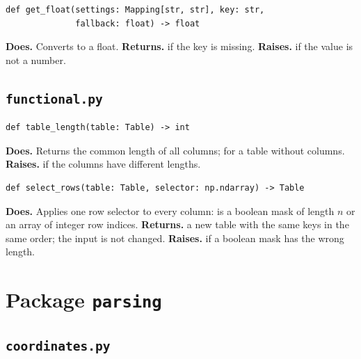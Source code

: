 \documentclass{article}
\newenvironment{card}{\par\smallskip\noindent\begin{minipage}{\linewidth}}{\end{minipage}\par}
\begin{document}
\begin{card}
\begin{lstlisting}[style=sig]
def get_float(settings: Mapping[str, str], key: str,
              fallback: float) -> float
\end{lstlisting}
\textbf{Does.} Converts  to a float. \textbf{Returns.}
 if the key is missing. \textbf{Raises.}  if
the value is not a number.
\end{card}

\subsection{\texttt{functional.py}}

\begin{card}
\begin{lstlisting}[style=sig]
def table_length(table: Table) -> int
\end{lstlisting}
\textbf{Does.} Returns the common length of all columns;  for a table
without columns. \textbf{Raises.}  if the columns have
different lengths.
\end{card}

\begin{card}
\begin{lstlisting}[style=sig]
def select_rows(table: Table, selector: np.ndarray) -> Table
\end{lstlisting}
\textbf{Does.} Applies one row selector to every column:  is a
boolean mask of length $n$ or an array of integer row indices. \textbf{Returns.}
a new table with the same keys in the same order; the input is not changed.
\textbf{Raises.}  if a boolean mask has the wrong length.
\end{card}

\section{Package \texttt{parsing}}

\subsection{\texttt{coordinates.py}}
\label{sec:coord}
\end{document}
